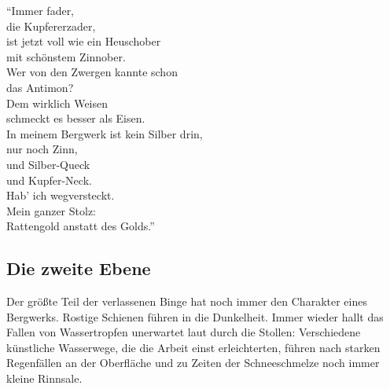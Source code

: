 

\enquote{Immer fader,\\ die Kupfererzader,\\
ist jetzt voll wie ein Heuschober\\ mit schönstem Zinnober.\\
Wer von den Zwergen kannte schon\\ das Antimon?\\
Dem wirklich Weisen\\ schmeckt es besser als Eisen.\\
In meinem Bergwerk ist kein Silber drin,\\ nur noch Zinn,\\
und Silber-Queck\\ und Kupfer-Neck.\\ Hab' ich wegversteckt.\\
Mein ganzer Stolz:\\ Rattengold anstatt des Golds.}



\neuespalte
\subsection{Die zweite Ebene}
Der größte Teil der verlassenen Binge hat noch immer den Charakter eines Bergwerks.
Rostige Schienen führen in die Dunkelheit.
Immer wieder hallt das Fallen von Wassertropfen unerwartet laut durch die Stollen:
Verschiedene künstliche Wasserwege, die die Arbeit einst erleichterten, führen nach starken Regenfällen an der Oberfläche und zu Zeiten der Schneeschmelze noch immer kleine Rinnsale.

